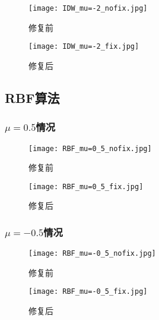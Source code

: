 \documentclass[14pt]{scrartcl} %
\begin{document}
\begin{figure}[h] %
	\begin{minipage}[t]{0.5\linewidth}
		\centering
		\texttt{[image: IDW\_mu=-2\_nofix.jpg]}
		\caption{修复前}
	\end{minipage}%
	\begin{minipage}[t]{0.5\linewidth}
		\centering
		\texttt{[image: IDW\_mu=-2\_fix.jpg]}
		\caption{修复后}
	\end{minipage}
\end{figure}

\subsection{RBF算法}

\subsubsection{$\mu=0.5$情况}

\begin{figure}[h] %
	\begin{minipage}[t]{0.5\linewidth}
		\centering
		\texttt{[image: RBF\_mu=0\_5\_nofix.jpg]}
		\caption{修复前}
	\end{minipage}%
	\begin{minipage}[t]{0.5\linewidth}
		\centering
		\texttt{[image: RBF\_mu=0\_5\_fix.jpg]}
		\caption{修复后}
	\end{minipage}
\end{figure}

\pagebreak
\subsubsection{$\mu=-0.5$情况}

\begin{figure}[h] %
	\begin{minipage}[t]{0.5\linewidth}
		\centering
		\texttt{[image: RBF\_mu=-0\_5\_nofix.jpg]}
		\caption{修复前}
	\end{minipage}%
	\begin{minipage}[t]{0.5\linewidth}
		\centering
		\texttt{[image: RBF\_mu=-0\_5\_fix.jpg]}
		\caption{修复后}
	\end{minipage}
\end{figure}
\end{document}
